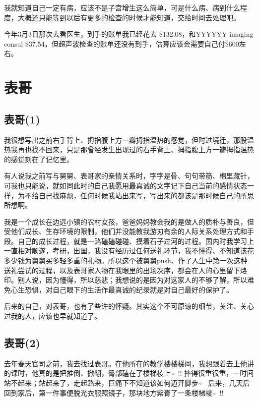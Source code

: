 \documentclass[12pt]{book}
\begin{document}
我就知道自己一定有病，应该不是子宫增生这么简单，可是什么病、病到什么程度，大概还只能等到以后有更多的检查的时候才能知道，交给时间去处理吧。

今年3月3日那次去看医生，到手的账单我已经花去 \$132.08，和YYYYYY imaging consul \$37.54，但超声波检查的账单还没有到手，估算应该会需要自己付\$600左右。

\chapter{表哥}
\label{sec-44}
\section{表哥(1)}
\label{sec-44-1}

我很想写出之前右手背上、拇指腹上方一瓣拇指温热的感觉，但时过境迁，那股温热我再也找不回来，只是那曾经发生出现过的右手背上、拇指腹上方一瓣拇指温热的感觉刻在了记忆里。

有人说我之前写与舅舅、表哥家的亲情关系时，字字是骨、句句带筋、棉里藏针，可我也只能说，就如同此时的自己我愿用最真诚的文字记下自己当前的感情状态一样，为不给自己找麻烦，任何时候我站出来写，写出来的都该是那时候自己的所思所想啊。

我是一个成长在边远小镇的农村女孩，爸爸妈妈教会我的是做人的质朴与善良，但受他们成长、生存环境的限制，他们并没能教我游刃有余的人际关系处理方式和手段。自己的成长过程，就是一路磕磕碰碰、摸着石子过河的过程。国内时我学习上一直相对顺遂，考研，出国，我没有经历过任何送礼环节，我不懂得、不知道该花多少钱为舅舅买多轻多重的礼物。所以这个被舅舅push、作了人生中第一次这种送礼尝试的过程，以及表哥家人物在我眼里的出场次序，都会在人的心里留下烙印。别人说，因为懂得，所以慈悲；我想说的是因为对这家人的不够了解，所以难免心生恐惧，对自己眼下的生活作最真诚的纪录就是对自己最好的保护了。

后来的自己，对表哥，也有了些许的怀疑。其实这个不可原谅的细节，关注、关心过我的人，应该也早就知道了。

\section{表哥(2)}
\label{sec-44-2}

去年春天官司之前，我去找过表哥。在他所在的教学楼楼梯间，我想跟着去上他讲的课时，他真的是把推倒、掀翻，臀部磕在了楼梯棱上\textasciitilde{}~!! 摔得很重很重，一时间站不起来；站起来了，走起路来，巨痛下不知道该如何迈开脚步\textasciitilde{}~ 后来，几天后回到家后，第一件事便脱光衣服照镜子，那块地方紫青了一条楼梯棱\textasciitilde{}~!! 
\end{document}
